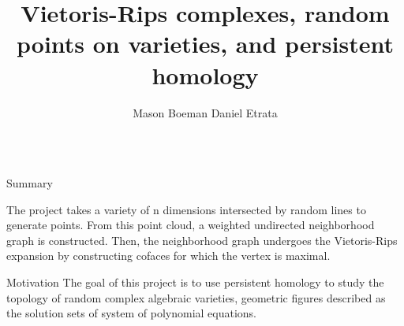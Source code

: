 \documentclass{beamer}
\title{Vietoris-Rips complexes, random points on varieties, and persistent homology}
\author{Mason Boeman \quad Daniel Etrata}
\institute{Mentors: Benjamin Antieau and J\={a}nis Lazovskis}
\begin{document}
\begin{frame}{}
\begin{columns}[t]

\begin{column}{0.32\linewidth}

\begin{block}{Summary}

The project takes a variety of n dimensions intersected by random lines to
generate points. From this point cloud, a weighted undirected neighborhood graph is constructed.
Then, the neighborhood graph undergoes the Vietoris-Rips expansion by constructing cofaces for which the vertex is maximal.
\end{block}



\begin{block}{Motivation}
The goal of this project is to use persistent homology to study the topology of random complex algebraic varieties,
geometric figures described as the solution sets of system of polynomial equations. 

\end{block}


\end{column}
\end{columns}
\end{frame}
\end{document}
